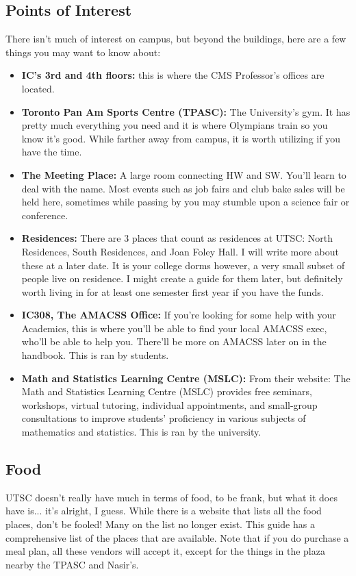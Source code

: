 \documentclass[11pt]{article}
\begin{document}
\subsection{Points of Interest}
There isn't much of interest on campus, but beyond the buildings, here are a few things you may want to know about:
\begin{itemize}
    \item \textbf{IC's 3rd and 4th floors:} this is where the CMS Professor's offices are located. 
    \item \textbf{Toronto Pan Am Sports Centre (TPASC):} The University's gym. It has pretty much everything you need and it is where Olympians train so you know it's good. While farther away from campus, it is worth utilizing if you have the time.
    \item \textbf{The Meeting Place:} A large room connecting HW and SW. You'll learn to deal with the name. Most events such as job fairs and club bake sales will be held here, sometimes while passing by you may stumble upon a science fair or conference. 
    \item \textbf{Residences:} There are 3 places that count as residences at UTSC: North Residences, South Residences, and Joan Foley Hall. I will write more about these at a later date. It is your college dorms however, a very small subset of people live on residence. I might create a guide for them later, but definitely worth living in for at least one semester first year if you have the funds.
    \item \textbf{IC308, The AMACSS Office:} If you're looking for some help with your Academics, this is where you'll be able to find your local AMACSS exec, who'll be able to help you. There'll be more on AMACSS later on in the handbook. This is ran by students.
    \item \textbf{Math and Statistics Learning Centre (MSLC):} From their website: The Math and Statistics Learning Centre (MSLC) provides free seminars, workshops, virtual tutoring, individual appointments, and small-group consultations to improve students’ proficiency in various subjects of mathematics and statistics. This is ran by the university.
\end{itemize}

\subsection{Food}
UTSC doesn't really have much in terms of food, to be frank, but what it does have is... it's alright, I guess. While there is a website that lists all the food places, don't be fooled! Many on the list no longer exist. This guide has a comprehensive list of the places that are available. Note that if you do purchase a meal plan, all these vendors will accept it, except for the things in the plaza nearby the TPASC and Nasir's.\par
\end{document}
